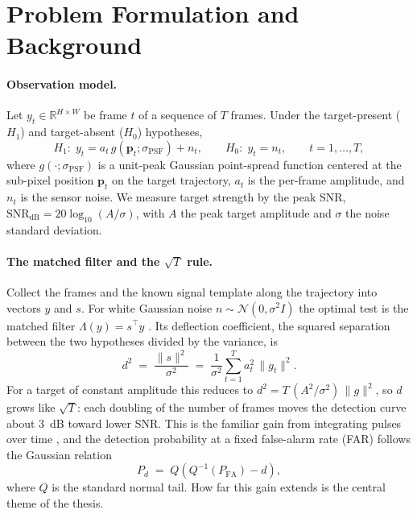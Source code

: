 \documentclass[11pt]{article}
\begin{document}
\section{Problem Formulation and Background}

\paragraph{Observation model.} Let $y_t \in \mathbb{R}^{H\times W}$ be frame $t$
of a sequence of $T$ frames. Under the target-present ($H_1$) and target-absent
($H_0$) hypotheses,
\begin{equation}
H_1:\; y_t = a_t\, g(\mathbf{p}_t;\sigma_{\mathrm{PSF}}) + n_t,
\qquad
H_0:\; y_t = n_t,
\qquad t = 1,\dots,T,
\label{eq:model}
\end{equation}
where $g(\cdot;\sigma_{\mathrm{PSF}})$ is a unit-peak Gaussian point-spread
function centered at the sub-pixel position $\mathbf{p}_t$ on the target
trajectory, $a_t$ is the per-frame amplitude, and $n_t$ is the sensor noise. We
measure target strength by the peak SNR,
$\mathrm{SNR}_{\mathrm{dB}} = 20\log_{10}(A/\sigma)$, with $A$ the peak target
amplitude and $\sigma$ the noise standard deviation.

\paragraph{The matched filter and the $\sqrt{T}$ rule.} Collect the frames and
the known signal template along the trajectory into vectors $y$ and $s$. For
white Gaussian noise $n\sim\mathcal{N}(0,\sigma^2 I)$ the optimal test is the
matched filter $\Lambda(y) = s^\top y$ \cite{kay}. Its deflection coefficient,
the squared separation between the two hypotheses divided by the variance, is
\begin{equation}
d^2 \;=\; \frac{\lVert s\rVert^2}{\sigma^2}
\;=\; \frac{1}{\sigma^2}\sum_{t=1}^{T} a_t^2\,\lVert g_t\rVert^2 .
\label{eq:deflection}
\end{equation}
For a target of constant amplitude this reduces to
$d^2 = T\,(A^2/\sigma^2)\,\lVert g\rVert^2$, so $d$ grows like $\sqrt{T}$: each
doubling of the number of frames moves the detection curve about $3$~dB toward
lower SNR. This is the familiar gain from integrating pulses over time
\cite{richards}, and the detection probability at a fixed false-alarm rate (FAR)
follows the Gaussian relation
\begin{equation}
P_d \;=\; Q\!\left(Q^{-1}(P_{\mathrm{FA}}) - d\right),
\label{eq:roc}
\end{equation}
where $Q$ is the standard normal tail. How far this gain extends is the central
theme of the thesis.
\end{document}
